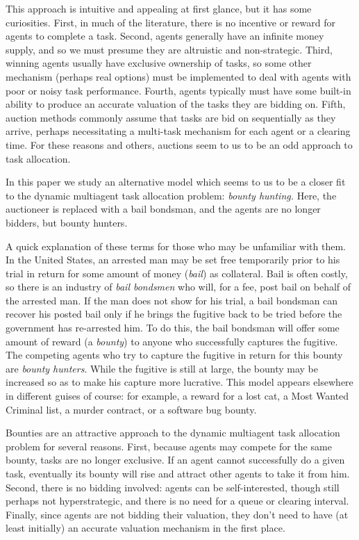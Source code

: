 \documentclass[letterpaper]{aamas2015}
\begin{document}
This approach is intuitive and appealing at first glance, but it has some curiosities.  First, in much of the literature, there is no incentive or reward for agents to complete a task.  Second, agents generally have an infinite money supply, and so we must presume they are altruistic and non-strategic.  Third, winning agents usually have exclusive ownership of tasks, so some other mechanism (perhaps real options) must be implemented to deal with agents with poor or noisy task performance.  Fourth, agents typically must have some built-in ability to produce an accurate valuation of the tasks they are bidding on.    Fifth,  auction methods commonly assume that tasks are bid on sequentially as they arrive, perhaps necessitating a multi-task mechanism for each agent or a clearing time.  For these reasons and others, auctions seem to us to be an odd approach to task allocation.  

In this paper we study an alternative model which seems to us to be a closer fit to the dynamic multiagent task allocation problem: {\it bounty hunting.}  Here, the auctioneer is replaced with a bail bondsman, and the agents are no longer bidders, but bounty hunters.

A quick explanation of these terms for those who may be unfamiliar with them.  In the United States, an arrested man may be set free temporarily prior to his trial in return for some amount of money ({\it bail}) as collateral.   Bail is often costly, so there is an industry of {\it bail bondsmen} who will, for a fee, post bail on behalf of the arrested man.  If the man does not show for his trial, a bail bondsman can recover his posted bail only if he brings the fugitive back to be tried before the government has re-arrested him.  To do this, the bail bondsman will offer some amount of reward (a {\it bounty}) to anyone who successfully captures the fugitive.   The competing agents who try to capture the fugitive in return for this bounty are {\it bounty hunters}.  While the fugitive is still at large, the bounty may be increased so as to make his capture more lucrative.   This model appears elsewhere in different guises of course: for example, a reward for a lost cat, a Most Wanted Criminal list, a murder contract, or a software bug bounty. 

Bounties are an attractive approach to the dynamic multiagent task allocation problem for several reasons.  First, because agents may compete for the same bounty, tasks are no longer exclusive.  If an agent cannot successfully do a given task, eventually its bounty will rise and attract other agents to take it from him.  Second, there is no bidding involved: agents can be self-interested, though still perhaps not hyperstrategic, and there is no need for a queue or clearing interval.  Finally, since agents are not bidding their valuation, they don't need to have (at least initially) an accurate valuation mechanism in the first place.
\end{document}
